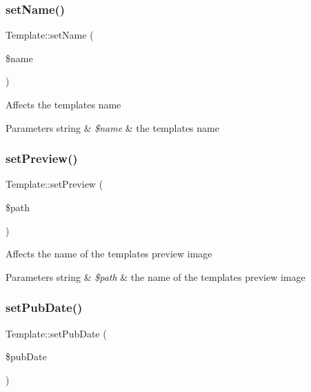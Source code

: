 \subsubsection{\texorpdfstring{set\+Name()}{setName()}}
{\footnotesize\ttfamily Template\+::set\+Name (\begin{DoxyParamCaption}\item[{}]{\$name }\end{DoxyParamCaption})}

Affects the template\textquotesingle{}s name 
\begin{DoxyParams}[1]{Parameters}
string & {\em \$name} & the template\textquotesingle{}s name \\
\hline
\end{DoxyParams}
\mbox{\label{classTemplate_ade3127512a43250093e33c2564aa1d8d}} 
\subsubsection{\texorpdfstring{set\+Preview()}{setPreview()}}
{\footnotesize\ttfamily Template\+::set\+Preview (\begin{DoxyParamCaption}\item[{}]{\$path }\end{DoxyParamCaption})}

Affects the name of the template\textquotesingle{}s preview image 
\begin{DoxyParams}[1]{Parameters}
string & {\em \$path} & the name of the template\textquotesingle{}s preview image \\
\hline
\end{DoxyParams}
\mbox{\label{classTemplate_a809420038abd5256b96bdb7c89b9f208}} 
\subsubsection{\texorpdfstring{set\+Pub\+Date()}{setPubDate()}}
{\footnotesize\ttfamily Template\+::set\+Pub\+Date (\begin{DoxyParamCaption}\item[{}]{\$pub\+Date }\end{DoxyParamCaption})}

